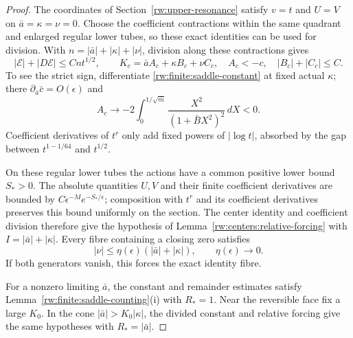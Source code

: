 \begin{proof}
The coordinates of Section~\ref{rw:upper-resonance} satisfy
$v=t$ and $U=V$ on $\bar a=\kappa=\nu=0$. Choose the coefficient
contractions within the same quadrant and enlarged regular lower
tubes, so these exact identities can be used for division. With
$n=|\bar a|+|\kappa|+|\nu|$, division along these contractions gives
\begin{equation}\label{rw:finite:saddle-center-estimates}
 |\mathcal E|+|D\mathcal E|\le Cnt^{1/2},\qquad
 K_c=\bar a A_c+\kappa B_c+\nu C_c,
 \quad A_c<-c,\quad |B_c|+|C_c|\le C.
\end{equation}
To see the strict sign, differentiate \eqref{rw:finite:saddle-constant}
at fixed actual $\kappa$; there
$\partial_{\bar a}\bar c=O(\epsilon)$ and
\[
 A_c\longrightarrow-2\int_0^{1/\sqrt{\bar m}}
                         \frac{X^2}{(1+\bar BX^2)^2}\,dX<0.
\]
Coefficient derivatives of $t^r$ only add fixed powers of $|\log t|$,
absorbed by the gap between $t^{1-1/64}$ and $t^{1/2}$.

On these regular lower tubes the actions have a common positive
lower bound $S_*>0$. The absolute quantities $U,V$ and their
finite coefficient derivatives are bounded by
$C\epsilon^{-M}e^{-S_*/\epsilon}$; composition with
$t^r$ and its coefficient derivatives preserves this bound uniformly
on the section. The center identity and coefficient division therefore
give the hypothesis of Lemma~\ref{rw:centers:relative-forcing} with
$I=|\bar a|+|\kappa|$. Every fibre containing a closing zero satisfies
\begin{equation}\label{rw:finite:saddle-relative-forcing}
 |\nu|\le\eta(\epsilon)(|\bar a|+|\kappa|),
 \qquad\eta(\epsilon)\longrightarrow0.
\end{equation}
If both generators vanish, this forces the exact identity fibre.

For a nonzero limiting $\bar a$, the constant and remainder estimates
satisfy Lemma~\ref{rw:finite:saddle-counting}\textup{(i)} with $R_*=1$.
Near the reversible face fix a large $K_0$. In the cone
$|\bar a|>K_0|\kappa|$, the divided constant and relative forcing
give the same hypotheses with $R_*=|\bar a|$.


\end{proof}
